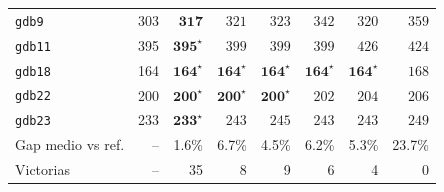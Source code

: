 \begin{table}[htbp]
\begin{tabular}{lrrrrrrr}
\texttt{gdb9} & 303 & $\mathbf{317}$ & $321$ & $323$ & $342$ & $320$ & $359$ \\
\texttt{gdb11} & 395 & $\mathbf{395}^{\star}$ & $399$ & $399$ & $399$ & $426$ & $424$ \\
\texttt{gdb18} & 164 & $\mathbf{164}^{\star}$ & $\mathbf{164}^{\star}$ & $\mathbf{164}^{\star}$ & $\mathbf{164}^{\star}$ & $\mathbf{164}^{\star}$ & $168$ \\
\texttt{gdb22} & 200 & $\mathbf{200}^{\star}$ & $\mathbf{200}^{\star}$ & $\mathbf{200}^{\star}$ & $202$ & $204$ & $206$ \\
\texttt{gdb23} & 233 & $\mathbf{233}^{\star}$ & $243$ & $245$ & $243$ & $243$ & $249$ \\
\midrule
Gap medio vs ref. & -- & 1.6\% & 6.7\% & 4.5\% & 6.2\% & 5.3\% & 23.7\% \\
Victorias & -- & 35 & 8 & 9 & 6 & 4 & 0 \\
\bottomrule
\end{tabular}
\end{table}
